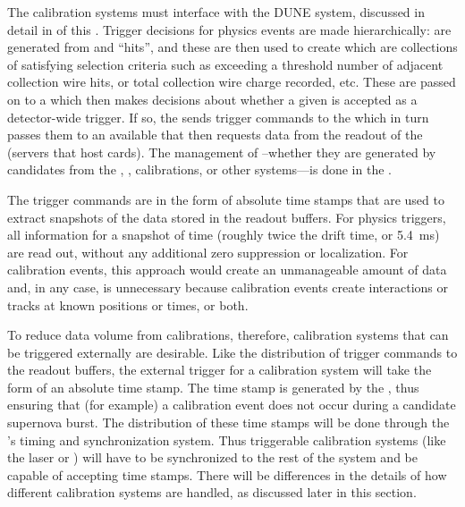 
The calibration systems must interface with the DUNE  system, discussed in detail in \spchdaq of this .
Trigger decisions for physics events are made %
hierarchically:  are generated from  and  ``hits'', and these  are then used to create  which are collections of  satisfying selection criteria such as exceeding a threshold number of adjacent collection wire hits, or total collection wire charge recorded, etc. These  are passed on to a  which then makes decisions about whether a given  is accepted as a detector-wide trigger.  If so, the  sends trigger commands to the  which in turn passes them to an available  that then requests data from the  readout of the  (servers that host  cards). The management of --whether they are generated by candidates from the , , calibrations, or other systems---is done in the . 

The trigger commands are in the form of absolute time stamps that are used to extract snapshots of the data stored in the  readout buffers. For physics triggers, all  information for a snapshot of time (roughly twice the drift time, or \SI{5.4}{\milli\s}) are read out, without any additional zero suppression or localization. For calibration events, this approach would create an unmanageable amount of data and, in any case, is unnecessary because calibration events create interactions or tracks at known positions or times, or both.


To reduce data volume from calibrations, therefore, calibration systems that can be triggered externally are desirable. Like the distribution of trigger commands to the  readout buffers, the external trigger for a calibration system will take the form of an absolute time stamp. The time stamp is generated by the , thus ensuring that (for example) a calibration event does not occur during a candidate supernova burst.  The distribution of these time stamps will be done through the 's timing and synchronization system. Thus triggerable calibration systems (like the laser or ) will have to be synchronized to the rest of the  system and be capable of accepting time stamps. There will be differences in the details of how different calibration systems are handled, as discussed later in this section. 

